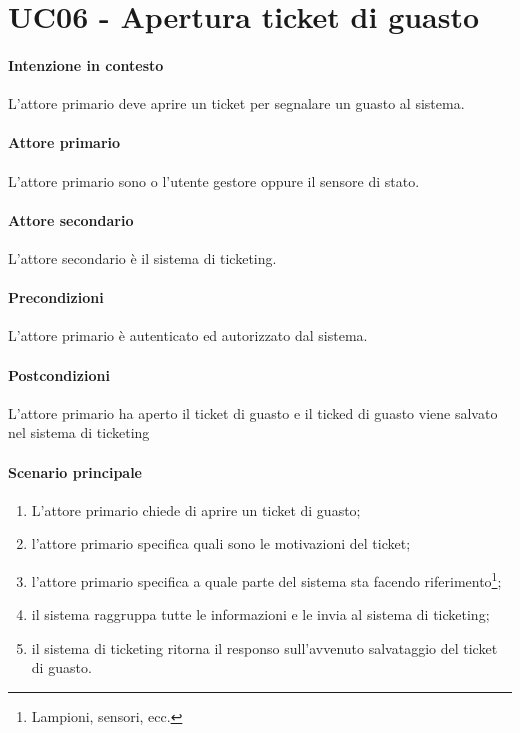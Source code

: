 \section{UC06 - Apertura ticket di guasto}\label{uc:06}

\paragraph{Intenzione in contesto} L'attore primario deve aprire un ticket per segnalare un guasto al sistema.

\paragraph{Attore primario} L'attore primario sono o l'utente gestore oppure il sensore di stato.

\paragraph{Attore secondario} L'attore secondario è il sistema di ticketing.


\paragraph{Precondizioni} L'attore primario è autenticato ed autorizzato dal sistema.

\paragraph{Postcondizioni} L'attore primario ha aperto il ticket di guasto e il ticked di guasto viene salvato nel sistema di ticketing

\paragraph{Scenario principale}

\begin{enumerate}
    \item L'attore primario chiede di aprire un ticket di guasto;
    \item l'attore primario specifica quali sono le motivazioni del ticket;
    \item l'attore primario specifica a quale parte del sistema sta facendo riferimento\footnote{Lampioni, sensori, ecc.};
    \item il sistema raggruppa tutte le informazioni e le invia al sistema di ticketing;
    \item il sistema di ticketing ritorna il responso sull'avvenuto salvataggio del ticket di guasto.
\end{enumerate}

